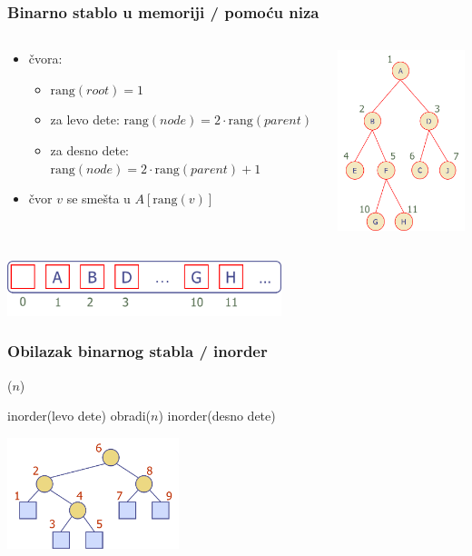 \documentclass[compress,aspectratio=169]{beamer}
\begin{document}
\begin{frame}[fragile]
  \frametitle{Binarno stablo u memoriji / pomoću niza}
\begin{columns}
  \begin{column}[c]{7cm}
  \begin{itemize}
    \item {} čvora: 
    \begin{itemize}
      \item $\text{rang}(root) = 1$
      \item za levo dete: $\text{rang}(node) = 2\cdot \text{rang}(parent)$
      \item za desno dete: $\text{rang}(node) = 2\cdot \text{rang}(parent) + 1$
    \end{itemize}
    \item čvor $v$ se smešta u $A[\text{rang}(v)]$
  \end{itemize}
  \end{column}
  \begin{column}[c]{5cm}
  \begin{center}
    \includegraphics[width=4cm]{asp-08-pic14.png}
  \end{center}
  \end{column}
\end{columns}
\begin{center}
  \includegraphics[width=8cm]{asp-08-pic15.png}
\end{center}
\end{frame}

\begin{frame}[fragile]
  \frametitle{Obilazak binarnog stabla / inorder}
($n$)
\begin{algorithmic}
  \STATE inorder(levo dete)
\ENDIF
\STATE obradi($n$)
  \STATE inorder(desno dete)
\ENDIF
\end{algorithmic}
\begin{center}
  \includegraphics[width=5cm]{asp-08-pic12.png}
\end{center}
\end{frame}
\end{document}
